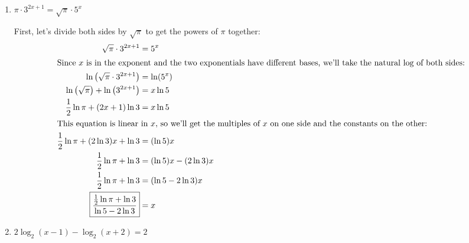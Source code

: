 \documentclass{article}
\theoremstyle{theorem}
\begin{document}
\begin{enumerate}[resume]
\begin{enumerate}
    \begin{solution}
      Dividing both sides by 5,
      \begin{align*}
        e^{2x} &= \frac{93}{5} \\
        \intertext{Taking the natural log of both sides,}
        2x &= \ln \left( \frac{93}{5} \right) \\
        x &= \boxed{\frac{\ln \left( \dfrac{93}{5} \right)}{2}}
      \end{align*}
    \end{solution}

  \item 

    \begin{problem}
      $\displaystyle\pi \cdot 3^{2x + 1} = \sqrt{\pi} \cdot 5^x$
    \end{problem}

    \begin{solution}
      First, let's divide both sides by $\sqrt{\pi}$ to get the powers of $\pi$ together:
      \begin{align*}
        \sqrt{\pi} \cdot 3^{2x + 1} &= 5^x\\
        \intertext{Since $x$ is in the exponent and the two exponentials have different bases, we'll take the natural log of both sides:}
        \ln \left(\sqrt{\pi} \cdot 3^{2x + 1} \right) &= \ln( 5^x)\\
        \ln \left( \sqrt{\pi} \right)  + \ln \left(3^{2x+1} \right) &= x \ln 5 \\
        \frac{1}{2} \ln \pi + (2x + 1) \ln 3 &= x \ln 5 \\
        \intertext{This equation is linear in $x$, so we'll get the multiples of $x$ on one side and the constants on the other:} %
        \frac{1}{2} \ln \pi + (2 \ln 3) x + \ln 3 &= (\ln 5) x \\
        \frac{1}{2} \ln \pi + \ln 3 &= (\ln 5) x - (2 \ln 3) x \\
        \frac{1}{2} \ln \pi + \ln 3 &= (\ln 5 - 2 \ln 3) x \\
        \boxed{\frac{\frac{1}{2} \ln \pi + \ln 3}{\ln 5 - 2 \ln 3}} &= x
      \end{align*}
    \end{solution}

  \item 
    \begin{problem}
      $2\log_2(x - 1) - \log_2(x + 2) = 2$
    \end{problem}


\end{enumerate}
\end{enumerate}
\end{document}
